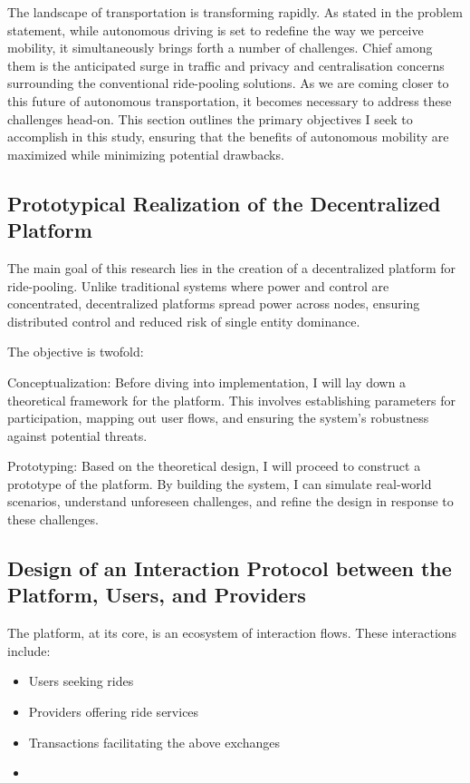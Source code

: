 The landscape of transportation is transforming rapidly. As stated in the problem statement, while autonomous driving is set to redefine the way we perceive mobility, it simultaneously brings forth a number of challenges. Chief among them is the anticipated surge in traffic and privacy and centralisation concerns surrounding the conventional ride-pooling solutions. As we are coming closer to this future of autonomous transportation, it becomes necessary to address these challenges head-on. This section outlines the primary objectives I seek to accomplish in this study, ensuring that the benefits of autonomous mobility are maximized while minimizing potential drawbacks.

\subsection{Prototypical Realization of the Decentralized Platform}

The main goal of this research lies in the creation of a decentralized platform for ride-pooling. Unlike traditional systems where power and control are concentrated, decentralized platforms spread power across nodes, ensuring distributed control and reduced risk of  single entity dominance.

The objective is twofold:

Conceptualization: Before diving into implementation, I will lay down a theoretical framework for the platform. This involves establishing parameters for participation, mapping out user flows, and ensuring the system's robustness against potential threats.

Prototyping: Based on the theoretical design, I will proceed to construct a prototype of the platform. By building the system, I can simulate real-world scenarios, understand unforeseen challenges, and refine the design in response to these challenges.

\subsection{Design of an Interaction Protocol between the Platform, Users, and Providers}

The platform, at its core, is an ecosystem of interaction flows. These interactions include:

\begin{itemize}
    \item Users seeking rides
    \item Providers offering ride services
    \item Transactions facilitating the above exchanges
    \item <TODO: Complete List>
\end{itemize}

